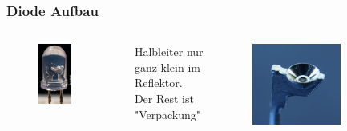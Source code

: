 \begin{frame}
    \frametitle{Diode Aufbau}
    \begin{columns}[c]
        \column[c]{5cm}
        \begin{center}
	\begin{figure}
            \includegraphics[width=0.7\textwidth, height=.8\textheight, keepaspectratio]{e12/Uvled_highres_macro.jpg}\\
	\end{figure}
        \end{center}
        \column{5cm}
            Halbleiter nur ganz klein im Reflektor. Der Rest ist "Verpackung"\\ 
	 \begin{figure}
            \includegraphics[width=0.7\textwidth, height=.8\textheight, keepaspectratio]{e12/Led_reflector.jpg}

\end{figure}
\end{columns}
\end{frame}
